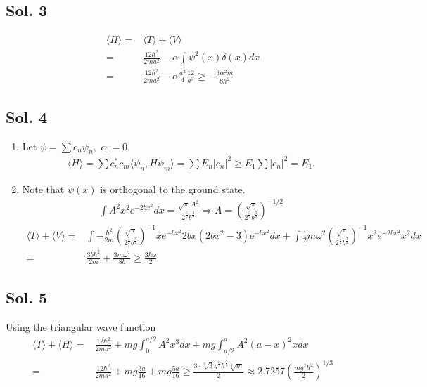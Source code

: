 \subsection*{Sol. 3}
\begin{align*}
    \langle H\rangle =& \langle T\rangle + \langle V\rangle\\
    =&\frac{12\hbar^2}{2ma^2} -\alpha
    \int \psi^2(x)\delta(x)dx\\
    =&
    \frac{12\hbar^2}{2ma^2} -\alpha\frac{a^2}{4}\frac{12}{a^3}\geq 
    - \frac{3 \alpha^{2} m}{8 \hbar^{2}}
\end{align*}

\subsection*{Sol. 4}
\begin{enumerate}
    \item Let $\psi = \sum c_n\psi_n,$ $c_0=0.$
    \begin{align*}
        \langle H \rangle = \sum c^*_nc_m\langle \psi_n, H\psi_m\rangle
        =\sum E_n|c_n|^2\geq E_1\sum |c_n|^2 = E_1.
    \end{align*}
    \item 
    Note that $\psi(x)$ is orthogonal to the ground state.
    \begin{align*}
        \int A^2x^2e^{-2bx^2}dx = \frac{\sqrt{\pi} \, A^{2}}{2^{\frac{5}{2}} b^{\frac{3}{2}}}\Rightarrow A = 
        \left(\frac{\sqrt{\pi} }{2^{\frac{5}{2}} b^{\frac{3}{2}}}\right)^{-1/2}
    \end{align*}
    \begin{align*}
        \langle T \rangle + \langle V \rangle = & 
        \int-\frac{\hbar^2}{2m}
        \left(\frac{\sqrt{\pi} }{2^{\frac{5}{2}} b^{\frac{3}{2}}}\right)^{-1}
        xe^{-bx^2}2bx \left(2bx^{2} - 3\right) \mathrm{e}^{-bx^{2}}
        dx + 
        \int 
        \frac{1}{2}m\omega^2 
        \left(\frac{\sqrt{\pi} }{2^{\frac{5}{2}} b^{\frac{3}{2}}}\right)^{-1}
        x^2e^{-2bx^2}x^2dx\\
        = &
        \frac{3b\hbar^{2}}{2m}
        +
        \frac{3m{\omega}^{2}}{8b}\geq \frac{3 \hbar \omega}{2}
    \end{align*}
\end{enumerate}

\subsection*{Sol. 5}
Using the triangular wave function
\begin{align*}
    \langle T \rangle + \langle H\rangle
    =&
    \frac{12\hbar^2}{2ma^2} + 
   mg \int_0^{a/2}A^2x^3dx + 
   mg \int_{a/2}^aA^2(a-x)^2xdx\\
   =&
   \frac{12\hbar^2}{2ma^2} + mg\frac{3a}{16}
   +mg\frac{5a}{16}
   \geq 
   \frac{3 \cdot \sqrt[3]{3} g^{\frac{2}{3}} \hbar^{\frac{2}{3}} \sqrt[3]{m}}{2}
   \approx 2.7257\left(\frac{mg^2\hbar^2}{2}\right)^{1/3}
\end{align*}

